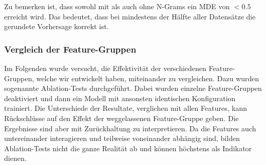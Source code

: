 \documentclass[10pt, a4paper]{article}
\begin{document}
Zu bemerken ist, dass sowohl mit als auch ohne N-Grams ein \ac{MDE} von \(<0.5\) erreicht wird. Das bedeutet, dass bei mindestens der Hälfte aller Datensätze die gerundete Vorhersage korrekt ist.

\subsubsection{Vergleich der Feature-Gruppen} \label{sec:ml_results_featuregroups}
Im Folgenden wurde versucht, die Effektivität der verschiedenen Fea\-tu\-re-Grup\-pen, welche wir entwickelt haben, miteinander zu vergleichen. Dazu wurden sogenannte Ablation-Tests durchgeführt. Dabei wurden einzelne Feature-Gruppen deaktiviert und dann ein Modell mit ansonsten identischen Konfiguration trainiert. Die Unterschiede der Resultate, verglichen mit allen Features, kann Rück\-schlüs\-se auf den Effekt der weggelassenen Feature-Gruppe geben. Die Ergebnisse sind aber mit Zurückhaltung zu interpretieren. Da die Features auch untereinander interagieren und teilweise voneinander abhängig sind, bilden Ablation-Tests nicht die ganze Realität ab und können höchstens als Indikator dienen.
\end{document}
